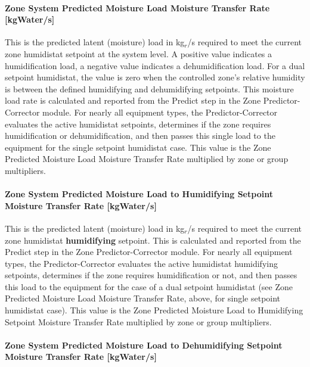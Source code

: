 \paragraph{Zone System Predicted Moisture Load Moisture Transfer Rate {[}kgWater/s{]}}\label{zone-predicted-moisture-load-moisture-transfer-rate-kgwaters}

This is the predicted latent (moisture) load in kg\(_{r}\)/s required to meet the current zone humidistat setpoint at the system level. A positive value indicates a humidification load, a negative value indicates a dehumidification load. For a dual setpoint humidistat, the value is zero when the controlled zone's relative humidity is between the defined humidifying and dehumidifying setpoints. This moisture load rate is calculated and reported from the Predict step in the Zone Predictor-Corrector module. For nearly all equipment types, the Predictor-Corrector evaluates the active humidistat setpoints, determines if the zone requires humidification or dehumidification, and then passes this single load to the equipment for the single setpoint humidistat case. This value is the Zone Predicted Moisture Load Moisture Transfer Rate multiplied by zone or group multipliers.

\paragraph{Zone System Predicted Moisture Load to Humidifying Setpoint Moisture Transfer Rate {[}kgWater/s{]}}\label{zone-predicted-moisture-load-to-humidifying-setpoint-moisture-transfer-rate-kgwaters}

This is the predicted latent (moisture) load in kg\(_{r}\)/s required to meet the current zone humidistat \textbf{humidifying} setpoint. This is calculated and reported from the Predict step in the Zone Predictor-Corrector module. For nearly all equipment types, the Predictor-Corrector evaluates the active humidistat humidifying setpoints, determines if the zone requires humidification or not, and then passes this load to the equipment for the case of a dual setpoint humidistat (see Zone Predicted Moisture Load Moisture Transfer Rate, above, for single setpoint humidistat case). This value is the Zone Predicted Moisture Load to Humidifying Setpoint Moisture Transfer Rate multiplied by zone or group multipliers.

\paragraph{Zone System Predicted Moisture Load to Dehumidifying Setpoint Moisture Transfer Rate {[}kgWater/s{]}}\label{zone-predicted-moisture-load-to-dehumidifying-setpoint-moisture-transfer-rate-kgwaters}


